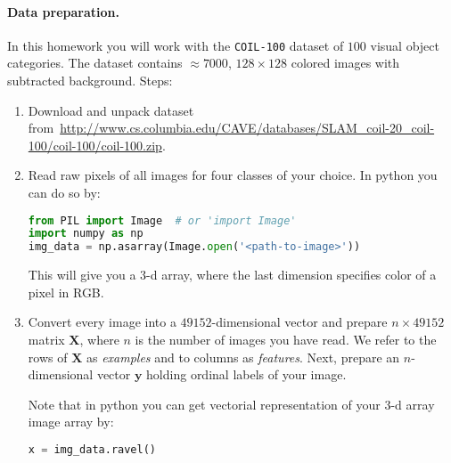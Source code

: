 \documentclass{article}
\begin{document}
\paragraph{Data preparation.} In this homework you will work with the \verb!COIL-100! dataset of $100$ visual object categories.
The dataset contains $\approx 7000$, $128\times 128$ colored images with subtracted background. Steps:
%
\begin{enumerate}
\item Download and unpack dataset from~\url{http://www.cs.columbia.edu/CAVE/databases/SLAM_coil-20_coil-100/coil-100/coil-100.zip}.
\item Read raw pixels of all images for four classes of your choice.
In python you can do so by:
\begin{lstlisting}[language=Python]
from PIL import Image  # or 'import Image'
import numpy as np
img_data = np.asarray(Image.open('<path-to-image>'))
\end{lstlisting}
This will give you a $3$-d array, where the last dimension specifies color of a pixel in RGB.
\item Convert every image into a $49152$-dimensional vector and prepare $n \times 49152$ matrix $\boldsymbol{X}$, where $n$ is the number of images you have read.
We refer to the rows of $\boldsymbol{X}$ as \emph{examples} and to columns as \emph{features}.
Next, prepare an $n$-dimensional vector $\boldsymbol{y}$ holding ordinal labels of your image.

Note that in python you can get vectorial representation of your $3$-d array image array by:
\begin{lstlisting}[language=Python]
x = img_data.ravel()
\end{lstlisting}
\end{enumerate}
\end{document}
